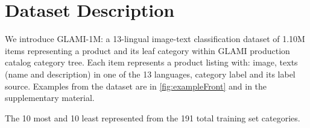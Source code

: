 \documentclass{bmvc2k}
\begin{document}
\section{Dataset Description}
\label{sec:GLAMI-1M}

We introduce GLAMI-1M: a 13-lingual image-text classification dataset of 1.10M items representing a product and its leaf category within GLAMI production catalog category tree.
Each item represents a product listing with:
 image, texts (name and description) in one of the 13 languages, category label and its label source.
Examples from the dataset are in \autoref{fig:exampleFront} and in the supplementary material.


\begin{table}[thb]
\centering
\caption{The 10 most and 10 least represented from the 191 total training set categories.}
\vspace{1mm}
\label{tab:top10cats}
        \setlength{\tabcolsep}{2.2pt}
\renewcommand{\arraystretch}{1.2}


\end{table}
\end{document}
